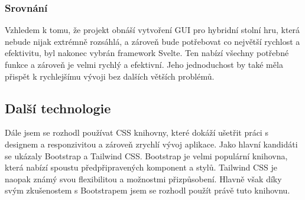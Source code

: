\subsubsection*{Srovnání}
Vzhledem k tomu, že projekt obnáší vytvoření GUI pro hybridní stolní hru, která nebude nijak extrémně rozsáhlá, a zároveň bude potřebovat co největší rychlost a efektivitu, byl nakonec vybrán framework Svelte. Ten nabízí všechny potřebné funkce a zároveň je velmi rychlý a efektivní. Jeho jednoduchost by také měla přispět k rychlejšímu vývoji bez dalších větších problémů.

\subsection{Další technologie}
Dále jsem se rozhodl používat CSS knihovny, které dokáží ušetřit práci s designem a responzivitou a zároveň zrychlí vývoj aplikace. Jako hlavní kandidáti se ukázaly Bootstrap a Tailwind CSS. Bootstrap je velmi populární knihovna, která nabízí spoustu předpřipravených komponent a stylů. Tailwind CSS je naopak známý svou flexibilitou a možnostmi přizpůsobení. Hlavně však díky svým zkušenostem s Bootstrapem jsem se rozhodl použít právě tuto knihovnu.